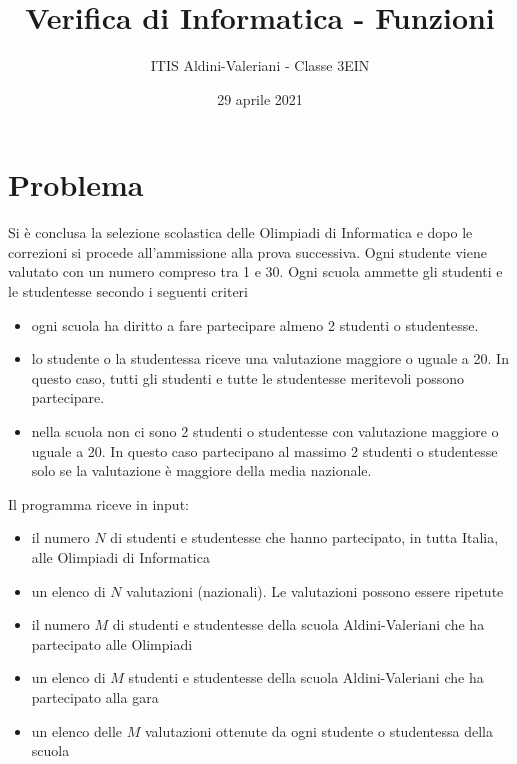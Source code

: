 \documentclass[a4paper, 11pt]{exam}
\title{Verifica di Informatica - Funzioni}
\author{ITIS Aldini-Valeriani - Classe 3EIN}
\date{29 aprile 2021}
\begin{document}
\maketitle
\begin{center}

\end{center}
\vspace{1em}

\section*{Problema}

Si è conclusa la selezione scolastica delle Olimpiadi di Informatica e dopo le correzioni si procede all'ammissione alla prova successiva. Ogni studente viene valutato con un numero compreso tra 1 e 30.
Ogni scuola ammette gli studenti e le studentesse secondo i seguenti criteri
\begin{itemize}
	\item ogni scuola ha diritto a fare partecipare almeno 2 studenti o studentesse.
	\item lo studente o la studentessa riceve una valutazione maggiore o uguale a 20. In questo caso, tutti gli studenti e tutte le studentesse meritevoli possono partecipare.
  \item nella scuola non ci sono 2 studenti o studentesse con valutazione maggiore o uguale a 20. In questo caso partecipano al massimo 2 studenti o studentesse solo se la valutazione è maggiore della media nazionale.
\end{itemize}
Il programma riceve in input:

\begin{itemize}
	\item	il numero $N$ di studenti e studentesse che hanno partecipato, in tutta Italia, alle Olimpiadi di Informatica
	\item un elenco di $N$ valutazioni (nazionali). Le valutazioni possono essere ripetute
	\item 	il numero $M$ di studenti e studentesse della scuola Aldini-Valeriani che ha partecipato alle Olimpiadi
	\item un elenco di $M$ studenti e studentesse  della scuola Aldini-Valeriani che ha partecipato alla gara
	\item un elenco delle $M$ valutazioni ottenute da ogni studente o studentessa della scuola
\end{itemize}
\end{document}
